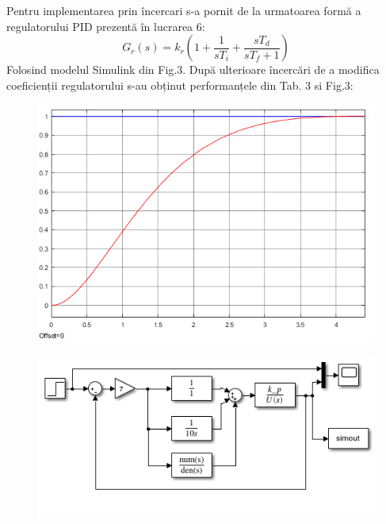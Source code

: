 \documentclass[11pt]{article}
\newcommand{\EqRow}{\vspace{1.5mm}}
\begin{document}
Pentru implementarea prin încercari s-a pornit de la urmatoarea formă a regulatorului PID prezentă în lucrarea 6:
\begin{equation} 
G_r(s)=k_r(1+\frac{1}{sT_i}+\frac{sT_d}{sT_f+1})
\end{equation}
Folosind modelul Simulink din Fig.3.
După ulterioare încercări de a modifica coeficienții regulatorului s-au obținut performanțele din Tab. 3 si Fig.3:
\EqRow
\begin{figure}[H]
	\centering
	\begin{minipage}{.4\textwidth}
		\centering
		\includegraphics[width=1\linewidth]{incercari.png}
		\label{fig:test2}
	\end{minipage}
	\begin{minipage}{.5\textwidth}
		\centering
		\includegraphics[width=1\linewidth]{sim_incercari.png}
		\label{fig:test2}
	\end{minipage}
\end{figure}
\end{document}
